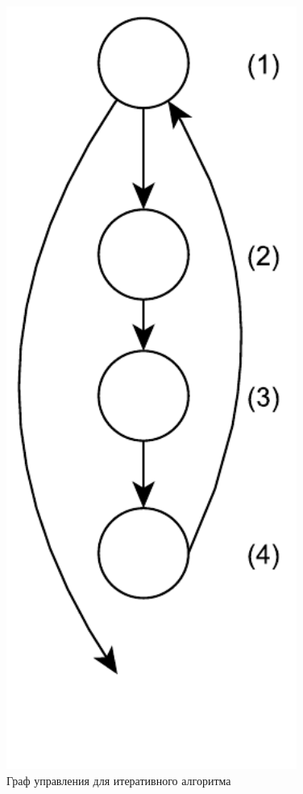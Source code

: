 \begin{figure}[H]
	\centering
	\includegraphics[width=0.85\textwidth,height=0.5\textheight,keepaspectratio]{images/iterative_control_graph}
	\caption{Граф управления для итеративного алгоритма}
	\label{iterative_control_graph}
\end{figure}


